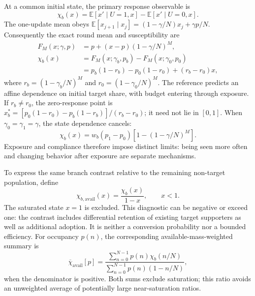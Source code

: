 At a common initial state, the primary response observable is
\begin{equation}
\boxed{\chi_b(x)=\mathbb{E}[x'\mid U=1,x]-\mathbb{E}[x'\mid U=0,x].}
\label{eq:control-susceptibility}
\end{equation}
The one-update mean obeys
$\mathbb{E}[x_{j+1}\mid x_j]=(1-\gamma/N)x_j+\gamma p/N$.
Consequently the exact round mean and susceptibility are
\begin{align}
F_M(x;\gamma,p)&=p+(x-p)(1-\gamma/N)^M,\\
\chi_b(x)&=F_M(x;\gamma_b,p_b)-F_M(x;\gamma_0,p_0)\nonumber\\
&=p_b(1-r_b)-p_0(1-r_0)+(r_b-r_0)x,
\label{eq:chi_finite_bias}
\end{align}
where $r_b=(1-\gamma_b/N)^M$ and $r_0=(1-\gamma_0/N)^M$.
The reference predicts an affine dependence on initial target share, with
budget entering through exposure. If $r_b\ne r_0$, the zero-response point is
$x_b^*=[p_0(1-r_0)-p_b(1-r_b)]/(r_b-r_0)$; it need not lie in $[0,1]$.
When $\gamma_0=\gamma_1=\gamma$, the state dependence cancels:
\begin{equation}
\chi_b(x)=w_b(p_1-p_0)\left[1-(1-\gamma/N)^M\right].
\label{eq:blackboard_equal_compliance}
\end{equation}
Exposure and compliance therefore impose distinct limits: being seen more
often and changing behavior after exposure are separate mechanisms.

To express the same branch contrast relative to the remaining non-target
population, define
\begin{equation}
\boxed{\chi_{b,\mathrm{avail}}(x)=\frac{\chi_b(x)}{1-x},\qquad x<1.}
\label{eq:blackboard_available_susceptibility}
\end{equation}
The saturated state $x=1$ is excluded. This diagnostic can be negative or
exceed one: the contrast includes differential retention of existing target
supporters as well as additional adoption. It is neither a conversion
probability nor a bounded efficiency. For occupancy $p(n)$, the corresponding
available-mass-weighted summary is
\begin{equation}
\overline{\chi}_{\mathrm{avail}}[p]
=\frac{\sum_{n=0}^{N-1}p(n)\chi_b(n/N)}
{\sum_{n=0}^{N-1}p(n)(1-n/N)},
\label{eq:blackboard_available_summary}
\end{equation}
when the denominator is positive. Both sums exclude saturation; this ratio
avoids an unweighted average of potentially large near-saturation ratios.


